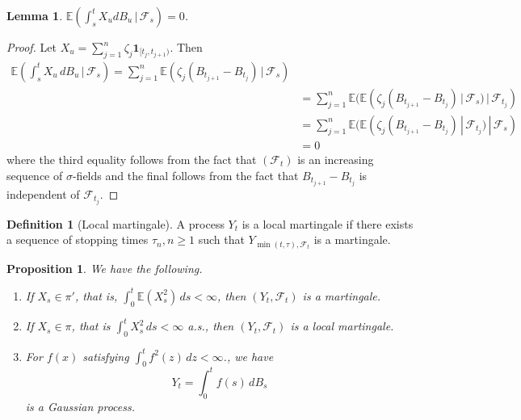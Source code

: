 \documentclass[10pt, oneside, reqno]{amsart}
\theoremstyle{plain}%
\newtheorem{lem}[thm]{Lemma}
\newtheorem{prop}[thm]{Proposition}
\theoremstyle{definition}
\newtheorem{defn}[thm]{Definition}
\theoremstyle{remark}
\newcommand{\given}{ \, | \,}
\newcommand{\E}{\mathbb{E}}
\newcommand{\sigf}{\mathcal{F}}
\begin{document}
\begin{lem}
    $\E(\int_s^t X_u dB_u \given \sigf_s) = 0$. 
\end{lem}
\begin{proof}
    Let $X_u = \sum_{j=1}^n \zeta_j \mathbf{1}_{[t_j, t_{j+1})}$.  Then 
    \begin{align*}
        \E(\int_s^t X_u \, dB_u \given \sigf_s) = \sum_{j=1}^n \E(\zeta_j (B_{t_{j+1}} - B_{t_j}) \given \sigf_s ) \\
                    &= \sum_{j=1}^n \E(\E(\zeta_j (B_{t_{j+1}} - B_{t_j}) \given \sigf_{s}) \given \sigf_{t_j}) \\
                    &= \sum_{j=1}^n \E(\E(\zeta_j (B_{t_{j+1}} - B_{t_j}) \given \sigf_{t_j}) \given \sigf_s) \\
                    &= 0
    \end{align*} where the third equality follows from the fact that $(\sigf_t)$ is an increasing sequence of $\sigma$-fields and the final follows from the fact that $B_{t_{j+1}} - B_{t_{j}}$ is independent of $\sigf_{t_j}$.  
\end{proof}

\begin{defn}[Local martingale]
    A process $Y_t$ is a local martingale if there exists a sequence of stopping times $\tau_n, n \geq 1$ such that $Y_{\min(t, \tau), \sigf_t}$ is a martingale.  
\end{defn}

\begin{prop}We have the following.  
    \begin{enumerate}
        \item If $X_s \in \pi'$, that is, $\int_0^t \E(X_s^2) \, ds < \infty$, then $(Y_t, \sigf_t)$ is a martingale.
        \item If $X_s \in \pi$, that is $\int_0^t X_s^2 \, ds < \infty $ a.s., then $(Y_t, \sigf_t)$ is a local martingale.  
        \item For $f(x)$ satisfying $\int_0^t f^2(z) \, dz < \infty$., we have \[
            Y_t = \int_0^t f(s) \, dB_s
        \] is a Gaussian process.  
    \end{enumerate}
\end{prop}
\end{document}
